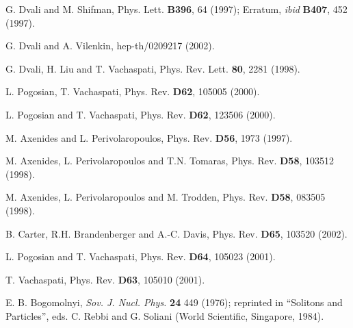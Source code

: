 \documentclass[a4paper,prd,nofootinbib,twocolumn,showpacs]{revtex4}
\begin{document}
\begin{thebibliography}{}

G. Dvali and M. Shifman, 
Phys. Lett. {\bf B396}, 64 (1997); Erratum, {\it ibid}
{\bf B407}, 452 (1997).

G. Dvali and A. Vilenkin,
hep-th/0209217 (2002).

G. Dvali, H. Liu and T. Vachaspati,
Phys. Rev. Lett. {\bf 80}, 2281 (1998).

L. Pogosian, T. Vachaspati,
Phys. Rev. {\bf D62}, 105005 (2000). 


L. Pogosian and T. Vachaspati,
Phys. Rev. {\bf D62}, 123506 (2000).

M. Axenides and L. Perivolaropoulos,
Phys. Rev. {\bf D56}, 1973 (1997).

M. Axenides, L. Perivolaropoulos and T.N. Tomaras,
Phys. Rev. {\bf D58}, 103512 (1998).

M. Axenides, L. Perivolaropoulos and M. Trodden,
Phys. Rev. {\bf D58}, 083505 (1998).

B. Carter, R.H. Brandenberger and A.-C. Davis,
Phys. Rev. {\bf D65}, 103520 (2002).

L. Pogosian and T. Vachaspati,
Phys. Rev. {\bf D64}, 105023 (2001).

T. Vachaspati, Phys. Rev. {\bf D63}, 105010 (2001).

%

E. B. Bogomolnyi, {\it Sov. J. Nucl. Phys.} {\bf 24}
449 (1976); reprinted in ``Solitons and Particles'', eds. C. Rebbi
and G. Soliani (World Scientific, Singapore, 1984).


\end{thebibliography}
\end{document}
